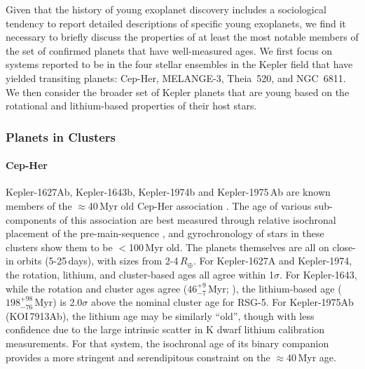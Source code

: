 \documentclass[11pt,twocolumn,tighten]{aastex63}
\begin{document}
%	
%





Given that the history of young exoplanet discovery includes a
sociological tendency to report detailed descriptions of specific
young exoplanets, we find it necessary to briefly discuss the
properties of at least the most notable members of the set of
confirmed planets that have well-measured ages.
We first focus on systems reported to be in the four stellar
ensembles in the Kepler field that have yielded transiting planets:
Cep-Her, MELANGE-3, Theia~520, and NGC~6811.
We then consider the broader set of Kepler planets that are young
based on the rotational and lithium-based properties of their host
stars.


\subsubsection{Planets in Clusters}
\label{subsec:clusterplanets}

\paragraph{Cep-Her}
Kepler-1627Ab, Kepler-1643b, Kepler-1974b and Kepler-1975\,Ab are
known members of the $\approx$40\,Myr old Cep-Her association
\citep{Bouma_2022a,Bouma_2022b}.  The age of various sub-components of
this association are best measured through relative isochronal
placement of the pre-main-sequence \citep[see][]{Bouma_2022b}, and
gyrochronology of stars in these clusters show them to be $<$100\,Myr
old.  The planets themselves are all on close-in orbits (5-25\,days),
with sizes from 2-4\,$R_\oplus$.  For Kepler-1627A and Kepler-1974,
the rotation, lithium, and cluster-based ages all agree within
1$\sigma$.  For Kepler-1643, while the rotation and cluster ages agree
($46^{+9}_{-7}$\,Myr; \citealt{Bouma_2022b}), the lithium-based age
($198^{+98}_{-76}$\,Myr) is 2.0$\sigma$ above the nominal cluster age
for RSG-5.  For Kepler-1975Ab (KOI\,7913Ab), the lithium age may be
similarly ``old'', though with less confidence due to the large
intrinsic scatter in K dwarf lithium calibration measurements.  For
that system, the isochronal age of its binary companion provides a
more stringent and serendipitous constraint on the $\approx$40\,Myr
age.
\end{document}
